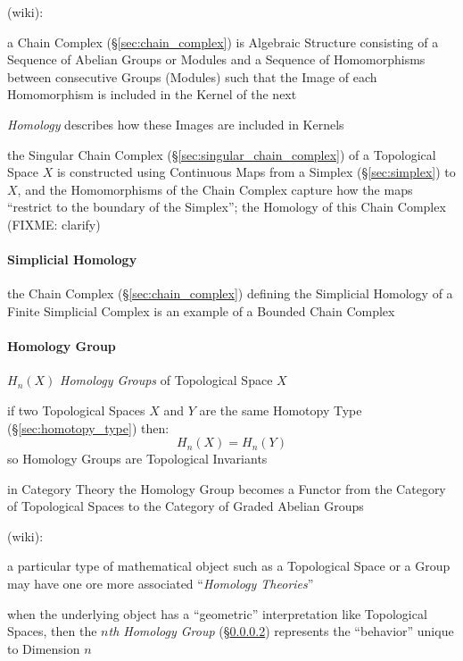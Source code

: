 (wiki):

a Chain Complex (\S\ref{sec:chain_complex}) is Algebraic Structure consisting
of a Sequence of Abelian Groups or Modules and a Sequence of Homomorphisms
between consecutive Groups (Modules) such that the Image of each Homomorphism
is included in the Kernel of the next

\emph{Homology} describes how these Images are included in Kernels

the Singular Chain Complex (\S\ref{sec:singular_chain_complex}) of a
Topological Space $X$ is constructed using Continuous Maps from a Simplex
(\S\ref{sec:simplex}) to $X$, and the Homomorphisms of the Chain Complex
capture how the maps ``restrict to the boundary of the Simplex''; the Homology
of this Chain Complex (FIXME: clarify)



\paragraph{Simplicial Homology}\label{sec:simplicial_homology}\hfill

the Chain Complex (\S\ref{sec:chain_complex}) defining the Simplicial Homology
of a Finite Simplicial Complex is an example of a Bounded Chain Complex



\paragraph{Homology Group}\label{sec:homology_group}\hfill

$H_n(X)$ \emph{Homology Groups} of Topological Space $X$

if two Topological Spaces $X$ and $Y$ are the same Homotopy Type
(\S\ref{sec:homotopy_type}) then:
\[
  H_n(X) = H_n(Y)
\]
so Homology Groups are Topological Invariants

in Category Theory the Homology Group becomes a Functor from the Category of
Topological Spaces to the Category of Graded Abelian Groups

(wiki):

a particular type of mathematical object such as a Topological Space or a
Group may have one ore more associated ``\emph{Homology Theories}''

when the underlying object has a ``geometric'' interpretation like Topological
Spaces, then the \emph{$n$th Homology Group} (\S\ref{sec:homology_group})
represents the ``behavior'' unique to Dimension $n$

